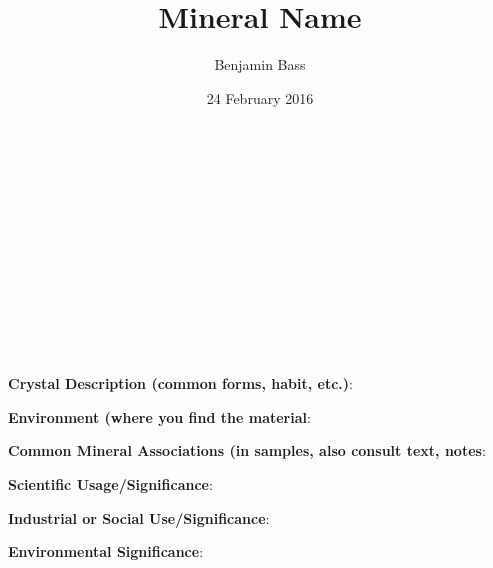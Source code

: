 \documentclass[10pt]{article}
\author{Benjamin Bass}
\date{24 February 2016}
\title{\vspace{-2.0cm}Mineral Name} %
\begin{document}
\maketitle


\\
\\
\\
\\
\\
\\
\\
\\
\\
\\

\begin{framed}
  \textbf{Crystal Description (common forms, habit, etc.)}: 
\end{framed}

\begin{framed}
  \textbf{Environment (where you find the material}: 
\end{framed}

\begin{framed}
  \textbf{Common Mineral Associations (in samples, also consult text, notes}:
\end{framed}

\begin{framed}
  \textbf{Scientific Usage/Significance}:
\end{framed}

\begin{framed}
  \textbf{Industrial or Social Use/Significance}:
\end{framed}

\begin{framed}
  \textbf{Environmental Significance}:
\end{framed}


\end{document}
